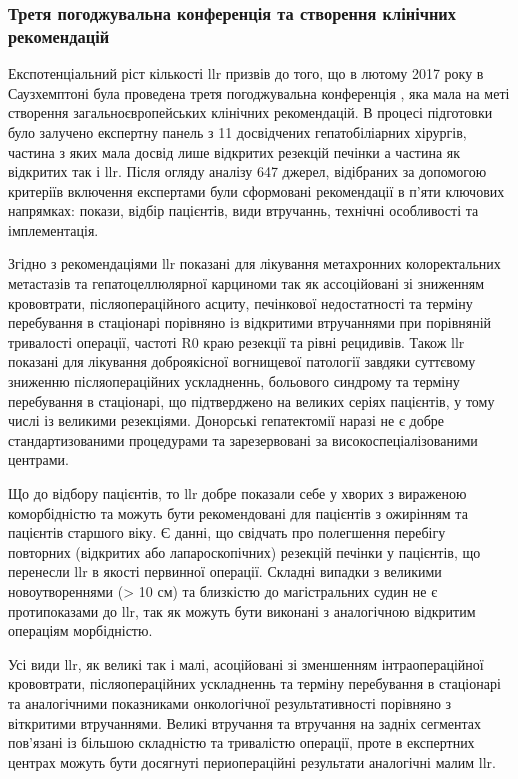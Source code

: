 \begin{refsection}
\subsubsection{Третя погоджувальна конференція та створення клінічних рекомендацій} 
Експотенціальний ріст кількості \acrshort{llr} призвів до того, що в лютому 2017 року в Саузхемптоні була проведена третя погоджувальна конференція \cite{AbuHilal2017a}, яка мала на меті створення загальноєвропейських клінічних рекомендацій. В процесі підготовки було залучено експертну панель з 11 досвідчених гепатобіліарних хірургів, частина з яких мала досвід лише відкритих резекцій печінки а частина як відкритих так і \acrshort{llr}. Після огляду аналізу 647 джерел, відібраних за допомогою критеріїв включення експертами були сформовані рекомендації в п'яти ключових напрямках: покази, відбір пацієнтів, види втручаннь, технічні особливості та імплементація.

Згідно з рекомендаціями \acrshort{llr} показані для лікування метахронних колоректальних метастазів та гепатоцеллюлярної карциноми так як ассоційовані зі зниженням крововтрати, післяопераційного асциту, печінкової недостатності та терміну перебування в стаціонарі порівняно із відкритими втручаннями при порівняній тривалості операції, частоті R0 краю резекції та рівні рецидивів. Також \acrshort{llr} показані для лікування доброякісної вогнищевої патології завдяки суттєвому зниженню післяопераційних ускладненнь, больового синдрому та терміну перебування в стаціонарі, що підтверджено на великих серіях пацієнтів, у тому числі із великими резекціями. Донорські гепатектомії наразі не є добре стандартизованими процедурами та зарезервовані за високоспеціалізованими центрами.

Що до відбору пацієнтів, то \acrshort{llr} добре показали себе у хворих з вираженою коморбідністю та можуть бути рекомендовані для пацієнтів з ожирінням та пацієнтів старшого віку. Є данні, що свідчать про полегшення перебігу повторних (відкритих або лапароскопічних) резекцій печінки у пацієнтів, що перенесли \acrshort{llr} в якості первинної операції. Складні випадки з великими новоутвореннями (> 10 см) та близкістю до магістральних судин не є протипоказами до \acrshort{llr}, так як можуть бути виконані з аналогічною відкритим операціям  морбідністю.

Усі види \acrshort{llr}, як великі так і малі, асоційовані зі зменшенням інтраопераційної крововтрати, післяопераційних ускладненнь та терміну перебування в стаціонарі та аналогічними показниками онкологічної результативності порівняно з віткритими втручаннями. Великі втручання та втручання на задніх сегментах пов'язані із більшою складністю та тривалістю операції, проте в експертних центрах можуть бути досягнуті периопераційні результати аналогічні малим \acrshort{llr}.


\end{refsection}
